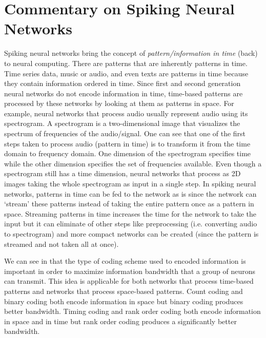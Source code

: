 \documentclass[12pt,A4]{article}
\begin{document}

\section*{Commentary on Spiking Neural Networks}

Spiking neural networks bring the concept of \emph{pattern/information in time} (back) to neural
computing. There are patterns that are inherently patterns in time. Time series data, music or 
audio, and even texts are patterns in time because they contain information ordered in time.
Since first and second generation neural networks do not encode information in time, time-based
patterns are processed by these networks by looking at them as patterns in space. For example, 
neural networks that process audio usually represent audio using its spectrogram. A spectrogram is
a two-dimensional image that visualizes the spectrum of frequencies of the audio/signal. One can 
see that one of the first steps taken to process audio (pattern in time) is to transform it from
the time domain to frequency domain. One dimension of the spectrogram specifies time while the other
dimension specifies the set of frequencies available. Even though a spectrogram still has a time
dimension, neural networks that process as 2D images taking the whole spectrogram as input in
a single step. In spiking neural networks, patterns in time can be fed to the network as is since 
the network can `stream' these patterns instead of taking the entire pattern once as a pattern in
space. Streaming patterns in time increases the time for the network to take the input but it can
eliminate of other steps like preprocessing (i.e. converting audio to spectrogram) and more 
compact networks can be created (since the pattern is streamed and not taken all at once). 

We can see in \cite{thorpe-2001-spike} that the type of coding scheme used to encoded information
is important in order to maximize information bandwidth that a group of neurons can transmit. This 
idea is applicable for both networks that process time-based patterns and networks that process
space-based patterns. Count coding and binary coding both encode information in space but binary coding
produces better bandwidth. Timing coding and rank order coding both encode information in space and
in time but rank order coding produces a significantly better bandwidth.
\end{document}
